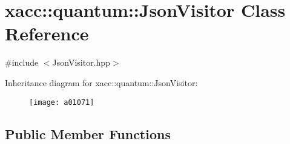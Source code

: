 \hypertarget{a01071}{}\section{xacc\+:\+:quantum\+:\+:Json\+Visitor Class Reference}
\label{a01071}


{\ttfamily \#include $<$Json\+Visitor.\+hpp$>$}

Inheritance diagram for xacc\+:\+:quantum\+:\+:Json\+Visitor\+:\begin{figure}[H]
\begin{center}
\leavevmode
\texttt{[image: a01071]}
\end{center}
\end{figure}
\subsection*{Public Member Functions}
